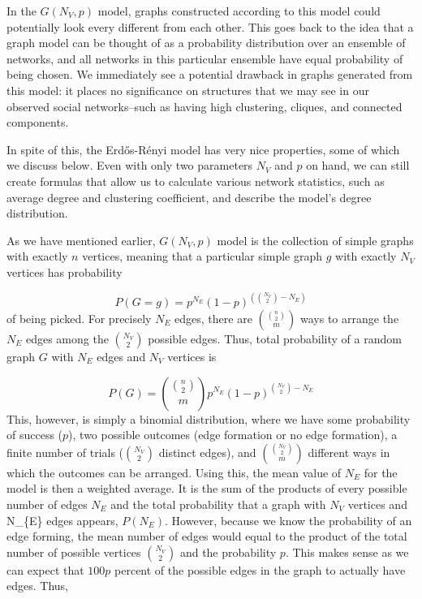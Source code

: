\documentclass[12pt,twoside]{amherstthesis}
\begin{document}
  In the \(G(N_V, p)\) model, graphs constructed according to this model
  could potentially look every different from each other. This goes back
  to the idea that a graph model can be thought of as a probability
  distribution over an ensemble of networks, and all networks in this
  particular ensemble have equal probability of being chosen. We
  immediately see a potential drawback in graphs generated from this
  model: it places no significance on structures that we may see in our
  observed social networks--such as having high clustering, cliques, and
  connected components.
  
  In spite of this, the Erdős-Rényi model has very nice properties, some
  of which we discuss below. Even with only two parameters \(N_{V}\) and
  \(p\) on hand, we can still create formulas that allow us to calculate
  various network statistics, such as average degree and clustering
  coefficient, and describe the model's degree distribution.
  
  As we have mentioned earlier, \(G(N_V, p)\) model is the collection of
  simple graphs with exactly \(n\) vertices, meaning that a particular
  simple graph \(g\) with exactly \(N_V\) vertices has probability
  
  \[P(G = g) = p^{N_E}(1 - p)^{\left({N_V \choose 2} - N_E \right)}\] of
  being picked. For precisely \(N_E\) edges, there are
  \({{n \choose 2} \choose m}\) ways to arrange the \(N_{E}\) edges among
  the \({N_V \choose 2}\) possible edges. Thus, total probability of a
  random graph \(G\) with \(N_{E}\) edges and \(N_{V}\) vertices is
  
  \[P(G) = {{n \choose 2} \choose m}p^{N_E}(1 - p)^{{N_V \choose 2} - N_E}\]
  This, however, is simply a binomial distribution, where we have some
  probability of success (\(p\)), two possible outcomes (edge formation or
  no edge formation), a finite number of trials (\({N_{V} \choose 2}\)
  distinct edges), and \({{N_{V} \choose 2} \choose m}\) different ways in
  which the outcomes can be arranged. Using this, the mean value of
  \(N_E\) for the model is then a weighted average. It is the sum of the
  products of every possible number of edges \(N_E\) and the total
  probability that a graph with \(N_{V}\) vertices and N\_\{E\} edges
  appears, \(P(N_{E})\). However, because we know the probability of an
  edge forming, the mean number of edges would equal to the product of the
  total number of possible vertices \({N_{V} \choose 2}\) and the
  probability \(p\). This makes sense as we can expect that \(100p\)
  percent of the possible edges in the graph to actually have edges. Thus,
  
\end{document}
